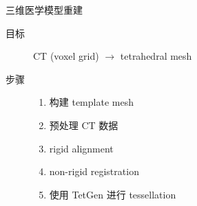 \documentclass{beamer}
\begin{document}
\begin{frame}{三维医学模型重建}
  \begin{description}
    \item[目标] CT (voxel grid) $\to$ tetrahedral mesh
    \item[步骤]
          \begin{enumerate}
            \item 构建 template mesh
            \item 预处理 CT 数据
            \item rigid alignment
            \item non-rigid registration
            \item 使用 TetGen 进行 tessellation
          \end{enumerate}
  \end{description}
  \begin{figure}
    \centering
  \end{figure}
\end{frame}
\end{document}
